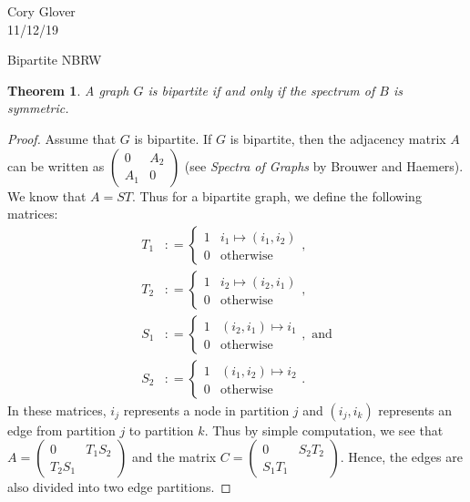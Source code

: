 \documentclass[a4paper]{article}
\newtheorem{theorem}{Theorem}
\begin{document}
\begin{flushright}
Cory Glover\\
11/12/19
\end{flushright}

\begin{center}
Bipartite NBRW
\end{center}

\begin{theorem}
A graph $G$ is bipartite if and only if the spectrum of $B$ is symmetric.
\end{theorem}

\begin{proof}
Assume that $G$ is bipartite. If $G$ is bipartite, then the adjacency matrix $A$ can be written as $\begin{pmatrix}0&A_2\\A_1&0\end{pmatrix}$ (see \emph{Spectra of Graphs} by Brouwer and Haemers). We know that $A=ST$. Thus for a bipartite graph, we define the following matrices:
\begin{align}
T_1&\colon=\begin{cases}1&i_1\mapsto(i_1,i_2)\\0&\text{otherwise}\end{cases},\\
T_2&\colon=\begin{cases}1&i_2\mapsto(i_2,i_1)\\0&\text{otherwise}\end{cases},\\
S_1&\colon=\begin{cases}1&(i_2,i_1)\mapsto i_1\\0&\text{otherwise}\end{cases},\text{ and}\\
S_2&\colon=\begin{cases}1&(i_1,i_2)\mapsto i_2\\0&\text{otherwise}\end{cases}.
\end{align}
In these matrices, $i_j$ represents a node in partition $j$ and $(i_j,i_k)$ represents an edge from partition $j$ to partition $k$.
Thus by simple computation, we see that $A=\begin{pmatrix}0&T_1S_2\\T_2S_1\end{pmatrix}$ and the matrix $C=\begin{pmatrix}0&S_2T_2\\S_1T_1\end{pmatrix}$.
Hence, the edges are also divided into two edge partitions.


\end{proof}
\end{document}
